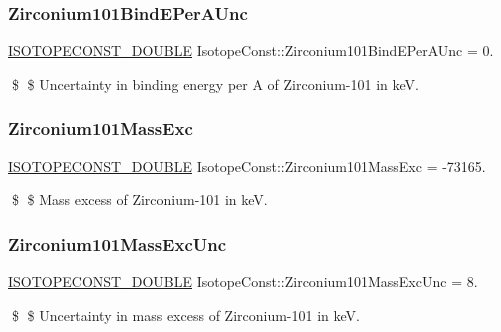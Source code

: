 \subsubsection{\texorpdfstring{Zirconium101\+Bind\+E\+Per\+A\+Unc}{Zirconium101BindEPerAUnc}}
{\footnotesize\ttfamily \mbox{\hyperlink{group___isotope_const-_macros_ga8f45a7272ce02c0b4c65c44636ed719a}{I\+S\+O\+T\+O\+P\+E\+C\+O\+N\+S\+T\+\_\+\+D\+O\+U\+B\+LE}} Isotope\+Const\+::\+Zirconium101\+Bind\+E\+Per\+A\+Unc = 0.}

\$ \$ Uncertainty in binding energy per A of Zirconium-\/101 in keV. \mbox{\label{group___isotope_const-_zirconium-_zr101_gab57ebb85ec3b46aa598fca71f58de2d3}} 
\subsubsection{\texorpdfstring{Zirconium101\+Mass\+Exc}{Zirconium101MassExc}}
{\footnotesize\ttfamily \mbox{\hyperlink{group___isotope_const-_macros_ga8f45a7272ce02c0b4c65c44636ed719a}{I\+S\+O\+T\+O\+P\+E\+C\+O\+N\+S\+T\+\_\+\+D\+O\+U\+B\+LE}} Isotope\+Const\+::\+Zirconium101\+Mass\+Exc = -\/73165.}

\$ \$ Mass excess of Zirconium-\/101 in keV. \mbox{\label{group___isotope_const-_zirconium-_zr101_ga920ba484a2c423232af3a3e2031c0a91}} 
\subsubsection{\texorpdfstring{Zirconium101\+Mass\+Exc\+Unc}{Zirconium101MassExcUnc}}
{\footnotesize\ttfamily \mbox{\hyperlink{group___isotope_const-_macros_ga8f45a7272ce02c0b4c65c44636ed719a}{I\+S\+O\+T\+O\+P\+E\+C\+O\+N\+S\+T\+\_\+\+D\+O\+U\+B\+LE}} Isotope\+Const\+::\+Zirconium101\+Mass\+Exc\+Unc = 8.}

\$ \$ Uncertainty in mass excess of Zirconium-\/101 in keV. \mbox{\label{group___isotope_const-_zirconium-_zr101_ga1e9a7e47c5d17bdc95e1550c84235f69}} 
